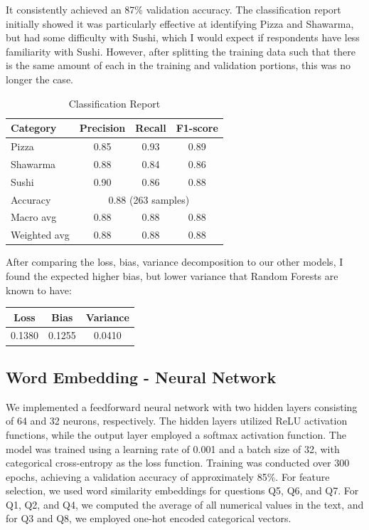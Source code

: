 \begin{itemize}
It consistently achieved an 87\% validation accuracy. The classification report initially showed it was particularly effective at identifying Pizza and Shawarma, but had some difficulty with Sushi, which I would expect if respondents have less familiarity with Sushi. However, after splitting the training data such that there is the same amount of each in the training and validation portions, this was no longer the case.
\begin{table}[ht]
    \centering
    \begin{tabular}{lccc}
        \hline
        Category     & Precision                              & Recall & F1-score \\
        \hline
        Pizza        & 0.85                                   & 0.93   & 0.89     \\
        Shawarma     & 0.88                                   & 0.84   & 0.86     \\
        Sushi        & 0.90                                   & 0.86   & 0.88     \\
        \hline
        Accuracy     & \multicolumn{3}{c}{0.88 (263 samples)}                     \\
        Macro avg    & 0.88                                   & 0.88   & 0.88     \\
        Weighted avg & 0.88                                   & 0.88   & 0.88     \\
        \hline
    \end{tabular}
    \caption{Classification Report}
    \label{tab:classification_report}
\end{table}

After comparing the loss, bias, variance decomposition to our other models, I found the expected higher bias, but lower variance that Random Forests are known to have:
\begin{table}[ht]
    \centering
    \begin{tabular}{ccc}
        \hline
        Loss   & Bias   & Variance \\
        \hline
        0.1380 & 0.1255 & 0.0410   \\
        \hline
    \end{tabular}
    \label{tab:loss_report}
\end{table}

\subsection{Word Embedding - Neural Network}
We implemented a feedforward neural network with two hidden layers consisting of 64 and 32 neurons, respectively. The hidden layers utilized ReLU activation functions, while the output layer employed a softmax activation function. The model was trained using a learning rate of 0.001 and a batch size of 32, with categorical cross-entropy as the loss function. Training was conducted over 300 epochs, achieving a validation accuracy of approximately 85\%. For feature selection, we used word similarity embeddings for questions Q5, Q6, and Q7. For Q1, Q2, and Q4, we computed the average of all numerical values in the text, and for Q3 and Q8, we employed one-hot encoded categorical vectors.


\end{itemize}
